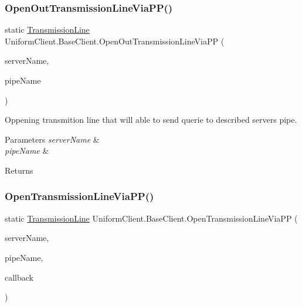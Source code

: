 \subsubsection{\texorpdfstring{Open\+Out\+Transmission\+Line\+Via\+P\+P()}{OpenOutTransmissionLineViaPP()}}
{\footnotesize\ttfamily static \mbox{\hyperlink{class_pipes_provider_1_1_client_1_1_transmission_line}{Transmission\+Line}} Uniform\+Client.\+Base\+Client.\+Open\+Out\+Transmission\+Line\+Via\+PP (\begin{DoxyParamCaption}\item[{string}]{server\+Name,  }\item[{string}]{pipe\+Name }\end{DoxyParamCaption})\hspace{0.3cm}{\ttfamily [static]}}



Oppening transmition line that will able to send querie to described server\textquotesingle{}s pipe. 


\begin{DoxyParams}{Parameters}
{\em server\+Name} & \\
\hline
{\em pipe\+Name} & \\
\hline
\end{DoxyParams}
\begin{DoxyReturn}{Returns}

\end{DoxyReturn}
\mbox{\label{class_uniform_client_1_1_base_client_a851ce49c50011eb0ed2552663c7731ab}} 
\subsubsection{\texorpdfstring{Open\+Transmission\+Line\+Via\+P\+P()}{OpenTransmissionLineViaPP()}\hspace{0.1cm}{\footnotesize\ttfamily [1/2]}}
{\footnotesize\ttfamily static \mbox{\hyperlink{class_pipes_provider_1_1_client_1_1_transmission_line}{Transmission\+Line}} Uniform\+Client.\+Base\+Client.\+Open\+Transmission\+Line\+Via\+PP (\begin{DoxyParamCaption}\item[{string}]{server\+Name,  }\item[{string}]{pipe\+Name,  }\item[{System.\+Action$<$ \mbox{\hyperlink{class_pipes_provider_1_1_client_1_1_transmission_line}{Transmission\+Line}} $>$}]{callback }\end{DoxyParamCaption})\hspace{0.3cm}{\ttfamily [static]}}



